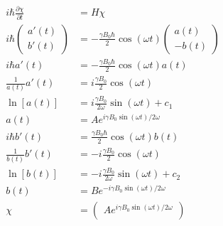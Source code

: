 \documentclass{article}
\begin{document}
\begin{enumerate}
        \begin{align*}
          i \hbar \frac{\partial \chi}{\partial t} & = H \chi                                                                  \\
          i \hbar \begin{pmatrix}
                    a'(t) \\
                    b'(t)
                  \end{pmatrix}                  & = -\frac{\gamma B_0 \hbar}{2} \cos (\omega t) \begin{pmatrix}
                                                                                                   a(t) \\
                                                                                                   -b(t)
                                                                                                 \end{pmatrix}                \\
          i \hbar a'(t)                            & = -\frac{\gamma B_0 \hbar}{2} \cos (\omega t) a(t)                        \\
          \frac{1}{a(t)} a'(t)                     & = i \frac{\gamma B_0}{2} \cos (\omega t)                                  \\
          \ln [a(t)]                               & = i \frac{\gamma B_0}{2 \omega} \sin (\omega t) + c_1                     \\
          a(t)                                     & = A e^{i \gamma B_0 \sin (\omega t) / 2 \omega}                           \\
          i \hbar b'(t)                            & = \frac{\gamma B_0 \hbar}{2} \cos (\omega t) b(t)                         \\
          \frac{1}{b(t)} b'(t)                     & = -i \frac{\gamma B_0}{2} \cos (\omega t)                                 \\
          \ln [b(t)]                               & = -i \frac{\gamma B_0}{2 \omega} \sin (\omega t) + c_2                    \\
          b(t)                                     & = B e^{-i \gamma B_0 \sin (\omega t) / 2 \omega}                          \\
          \chi                                     & = \begin{pmatrix}
                                                         A e^{i \gamma B_0 \sin (\omega t) / 2 \omega} \\

\end{pmatrix}
\end{align*}
\end{enumerate}
\end{document}
